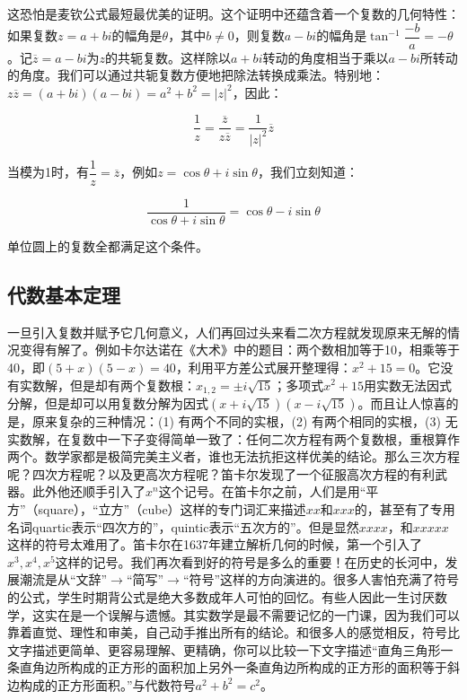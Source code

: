 \documentclass[b5paper]{ctexart}
\begin{document}
这恐怕是麦钦公式最短最优美的证明。这个证明中还蕴含着一个复数的几何特性：如果复数$z = a + bi$的幅角是$\theta$，其中$b \ne 0$，则复数$a - bi$的幅角是$\tan^{-1}\dfrac{-b}{a} = -\theta$。记$\overline{z} = a - bi$为$z$的共轭复数。这样除以$a + bi$转动的角度相当于乘以$a - bi$所转动的角度。我们可以通过共轭复数方便地把除法转换成乘法。特别地：$z\overline{z} = (a + bi)(a - bi) = a^2 + b^2 = |z|^2$，因此：

\[
\frac{1}{z} = \frac{\overline{z}}{z\overline{z}} = \frac{1}{|z|^2}\overline{z}
\]

当模为1时，有$\dfrac{1}{z} = \overline{z}$，例如$z = \cos\theta + i\sin\theta$，我们立刻知道：

\[
\frac{1}{\cos\theta + i\sin\theta} = \cos\theta - i\sin\theta
\]

单位圆上的复数全都满足这个条件。

\subsection{代数基本定理}

一旦引入复数并赋予它几何意义，人们再回过头来看二次方程就发现原来无解的情况变得有解了。例如卡尔达诺在《大术》中的题目：两个数相加等于10，相乘等于40，即$(5 + x)(5 - x) = 40$，利用平方差公式展开整理得：$x^2 + 15 = 0$。它没有实数解，但是却有两个复数根：$x_{1,2} = \pm i\sqrt{15}$；多项式$x^2 + 15$用实数无法因式分解，但是却可以用复数分解为因式$(x + i\sqrt{15})(x - i\sqrt{15})$。而且让人惊喜的是，原来复杂的三种情况：(1) 有两个不同的实根，(2) 有两个相同的实根，(3) 无实数解，在复数中一下子变得简单一致了：任何二次方程有两个复数根，重根算作两个。数学家都是极简完美主义者，谁也无法抗拒这样优美的结论。那么三次方程呢？四次方程呢？以及更高次方程呢？笛卡尔发现了一个征服高次方程的有利武器。此外他还顺手引入了$x^n$这个记号。在笛卡尔之前，人们是用“平方”（square），“立方”（cube）这样的专门词汇来描述$xx$和$xxx$的，甚至有了专用名词quartic表示“四次方的”，quintic表示“五次方的”。但是显然$xxxx$，和$xxxxx$这样的符号太难用了。笛卡尔在1637年建立解析几何的时候，第一个引入了$x^3, x^4, x^5$这样的记号。我们再次看到好的符号是多么的重要！在历史的长河中，发展潮流是从“文辞”$\to$“简写”$\to$“符号”这样的方向演进的。很多人害怕充满了符号的公式，学生时期背公式是绝大多数成年人可怕的回忆。有些人因此一生讨厌数学，这实在是一个误解与遗憾。其实数学是最不需要记忆的一门课，因为我们可以靠着直觉、理性和审美，自己动手推出所有的结论。和很多人的感觉相反，符号比文字描述更简单、更容易理解、更精确，你可以比较一下文字描述“直角三角形一条直角边所构成的正方形的面积加上另外一条直角边所构成的正方形的面积等于斜边构成的正方形面积。”与代数符号$a^2 + b^2 = c^2$。
\end{document}
